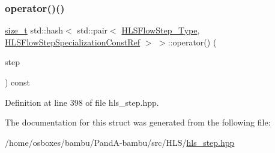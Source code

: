 \subsubsection{\texorpdfstring{operator()()}{operator()()}}
{\footnotesize\ttfamily \hyperlink{tutorial__fpt__2017_2intro_2sixth_2test_8c_a7c94ea6f8948649f8d181ae55911eeaf}{size\+\_\+t} std\+::hash$<$ std\+::pair$<$ \hyperlink{hls__step_8hpp_ada16bc22905016180e26fc7e39537f8d}{H\+L\+S\+Flow\+Step\+\_\+\+Type}, \hyperlink{hls__step_8hpp_a5fdd2edf290c196531d21d68e13f0e74}{H\+L\+S\+Flow\+Step\+Specialization\+Const\+Ref} $>$ $>$\+::operator() (\begin{DoxyParamCaption}\item[{std\+::pair$<$ \hyperlink{hls__step_8hpp_ada16bc22905016180e26fc7e39537f8d}{H\+L\+S\+Flow\+Step\+\_\+\+Type}, \hyperlink{hls__step_8hpp_a5fdd2edf290c196531d21d68e13f0e74}{H\+L\+S\+Flow\+Step\+Specialization\+Const\+Ref} $>$}]{step }\end{DoxyParamCaption}) const\hspace{0.3cm}{\ttfamily [inline]}}



Definition at line 398 of file hls\+\_\+step.\+hpp.



The documentation for this struct was generated from the following file\+:\begin{DoxyCompactItemize}
\item 
/home/osboxes/bambu/\+Pand\+A-\/bambu/src/\+H\+L\+S/\hyperlink{hls__step_8hpp}{hls\+\_\+step.\+hpp}\end{DoxyCompactItemize}
